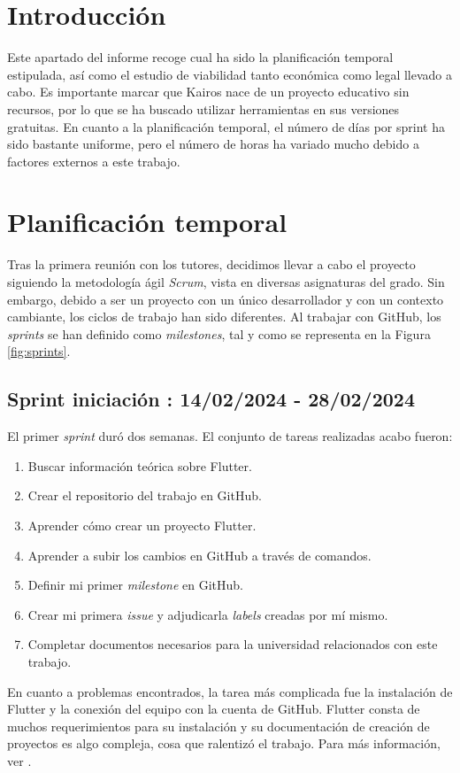
\section{Introducción}

	Este apartado del informe recoge cual ha sido la planificación temporal estipulada, así como el estudio de viabilidad tanto económica como legal llevado a cabo. Es importante marcar que Kairos nace de un proyecto educativo sin recursos, por lo que se ha buscado utilizar herramientas en sus versiones gratuitas. En cuanto a la planificación temporal, el número de días por sprint ha sido bastante uniforme, pero el número de horas ha variado mucho debido a factores externos a este trabajo.	

\section{Planificación temporal}

	Tras la primera reunión con los tutores, decidimos llevar a cabo el proyecto siguiendo la metodología ágil \emph{Scrum}, vista en diversas asignaturas del grado. Sin embargo, debido a ser un proyecto con un único desarrollador y con un contexto cambiante, los ciclos de trabajo han sido diferentes. Al trabajar con GitHub, los \emph{sprints} se han definido como \emph{milestones}, tal y como se representa en la Figura \ref{fig:sprints}.
	

\subsection{Sprint iniciación : 14/02/2024 - 28/02/2024}

	El primer \emph{sprint} duró dos semanas. El conjunto de tareas realizadas acabo fueron:
	\begin{enumerate}
		\item Buscar información teórica sobre Flutter.
		\item Crear el repositorio del trabajo en GitHub.
		\item Aprender cómo crear un proyecto Flutter.
		\item Aprender a subir los cambios en GitHub a través de comandos.
		\item Definir mi primer \emph{milestone} en GitHub.
		\item Crear mi primera \emph{issue} y adjudicarla \emph{labels} creadas por mí mismo.
		\item Completar documentos necesarios para la universidad relacionados con este trabajo.
	\end{enumerate}
	En cuanto a problemas encontrados, la tarea más complicada fue la instalación de Flutter y la conexión del equipo con la cuenta de GitHub. Flutter consta de muchos requerimientos para su instalación y su documentación de creación de proyectos es algo compleja, cosa que ralentizó el trabajo. Para más información, ver \cite{flutter}.
	
